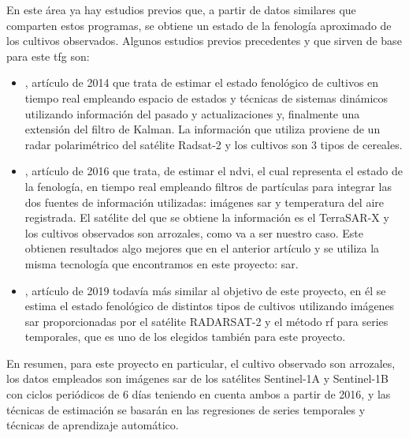 \par En este área ya hay estudios previos que, a partir de datos similares que comparten estos programas, se obtiene un estado de la fenología aproximado de los cultivos observados. Algunos estudios previos precedentes y que sirven de base para este \gls{tfg} son:
\\
\begin{itemize}
    \item \cite{Juanma2014}, artículo de 2014 que trata de estimar el estado fenológico de cultivos en tiempo real empleando espacio de estados y técnicas de sistemas dinámicos utilizando información del pasado y actualizaciones y, finalmente una extensión del filtro de Kalman. La información que utiliza proviene de un radar polarimétrico del satélite Radsat-2 y los cultivos son 3 tipos de cereales. 
    \\
    \item \cite{Juanma2016}, artículo de 2016 que trata, de estimar el \gls{ndvi}, el cual representa el estado de la fenología, en tiempo real empleando filtros de partículas para integrar las dos fuentes de información utilizadas: imágenes \gls{sar} y temperatura del aire registrada. El satélite del que se obtiene la información es el TerraSAR-X y los cultivos observados son arrozales, como va a ser nuestro caso. Este obtienen resultados algo mejores que en el anterior artículo y se utiliza la misma tecnología que encontramos en este proyecto: \gls{sar}. 
    \\
    \item \cite{artRF}, artículo de 2019 todavía más similar al objetivo de este proyecto, en él se estima el estado fenológico de distintos tipos de cultivos utilizando imágenes \gls{sar} proporcionadas por el satélite RADARSAT-2 y el método \gls{rf} para series temporales, que es uno de los elegidos también para este proyecto. 
\end{itemize} 

\par En resumen, para este proyecto en particular, el cultivo observado son arrozales, los datos empleados son imágenes \gls{sar} de los satélites Sentinel-1A y Sentinel-1B con ciclos periódicos de 6 días teniendo en cuenta ambos a partir de 2016, y las técnicas de estimación se basarán en las regresiones de series temporales y técnicas de aprendizaje automático. 
\\


